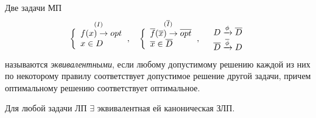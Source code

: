 \begin{definition}
    Две задачи МП
    \[
        \overset{(\RomanNumeralCaps{1})}{\left\{\begin{array}{l}
                f(x) \rightarrow opt \\
                x \in D
            \end{array}\right.}, \quad \overset{(\overline{\RomanNumeralCaps{1}})}{\left\{\begin{array}{l}
                \overline{f}(\overline{x}) \rightarrow \overline{opt} \\
                \overline{x} \in \overline{D}
            \end{array}\right.}, \quad \begin{array}{l}
            D \xrightarrow[]{\phi} \overline{D}            \\
            \overline{D} \xrightarrow[]{\overline{\phi}} D \\
        \end{array}
    \]
    называются \emph{эквивалентными}, если любому допустимому решению каждой из них по некоторому правилу соответствует допустимое решение другой задачи, причем оптимальному решению соответствует оптимальное.
\end{definition}

\begin{theorem}
    Для любой задачи ЛП $ \exists $ эквивалентная ей каноническая ЗЛП.
\end{theorem}

\newpage

